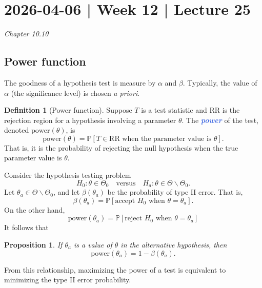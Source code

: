 \documentclass[10pt]{article}
\newtheorem{proposition}[theorem]{Proposition}
\theoremstyle{definition}
\newtheorem{definition}[theorem]{Definition}
\newcommand{\1}[1]{\textbf{1}_{\left[#1\right]}} %
\def\P{\mathbb{P}} %
\newcommand{\demph}[1]{\textcolor{RoyalBlue}{\textbf{\slshape #1}}} %
\begin{document}
\newpage
\section{2026-04-06 | Week 12 | Lecture 25}
\textit{Chapter 10.10}

\subsection{Power function}
The goodness of a hypothesis test is measure by $\alpha$ and $\beta$.
Typically, the value of $\alpha$ (the significance level) is chosen \textit{a
  priori}.

\begin{definition}[Power function]
  Suppose $T$ is a test statistic and $\text{RR}$ is the rejection region for
  a hypothesis involving a parameter $\theta$. The \demph{power} of the test,
  denoted $\text{power}(\theta)$, is
  \begin{equation*}
    \text{power}(\theta) = \P\left[T \in \text{RR when the parameter value is }\theta \right].
  \end{equation*}
  That is, it is the probability of rejecting the null hypothesis when the true
  parameter value is $\theta$.
\end{definition}

Consider the hypothesis testing problem
\begin{equation*}
  H_{0}: \theta\in \Theta_{0} \quad \text{versus} \quad H_{a}: \theta\in \Theta\backslash \Theta_{0}.
\end{equation*}
Let $\theta_{a}\in \Theta\backslash \Theta_{0}$, and let $\beta(\theta_{a})$
be the probability of type II error. That is,
\begin{equation*}
  \beta(\theta_{a}) = \P\left[\text{accept }H_{0}\text{ when }\theta=\theta_{a} \right].
\end{equation*}
On the other hand,
\begin{equation*}
  \text{power}(\theta_{a}) = \P\left[\text{reject }H_{0}\text{ when }\theta=\theta_{a} \right]
\end{equation*}
It follows that
\begin{proposition}
  If $\theta_{a}$ is a value of $\theta$ in the alternative hypothesis, then
  \begin{equation*}
    \text{power}(\theta_{a}) = 1 - \beta(\theta_{a}).
  \end{equation*}
\end{proposition}
From this relationship, maximizing the power of a test is equivalent to
minimizing the type II error probability.
\end{document}
